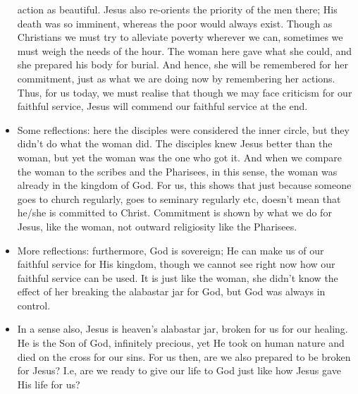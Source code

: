 \begin{itemize}
{  action as beautiful.  Jesus also re-orients the priority of the men there;
  His death was so imminent, whereas the poor would always exist.  Though as
  Christians we must try to alleviate poverty wherever we can, sometimes we
  must weigh the needs of the hour.  The woman here gave what she could, and
  she prepared his body for burial.  And hence, she will be remembered for
  her commitment, just as what we are doing now by remembering her actions.
  Thus, for us today, we must realise that though we may face criticism for
  our faithful service, Jesus will commend our faithful service at the end.
  }
  \item{Some reflections: here the disciples were considered the inner
  circle, but they didn't do what the woman did.  The disciples knew Jesus
  better than the woman, but yet the woman was the one who got it.  And when
  we compare the woman to the scribes and the Pharisees, in this sense, the
  woman was already in the kingdom of God.  For us, this shows that just
  because someone goes to church regularly, goes to seminary regularly etc,
  doesn't mean that he/she is committed to Christ.  Commitment is shown by
  what we do for Jesus, like the woman, not outward religiosity like the
  Pharisees.}
  \item{More reflections: furthermore, God is sovereign; He can make us of
  our faithful service for His kingdom, though we cannot see right now how
  our faithful service can be used.  It is just like the woman, she didn't
  know the effect of her breaking the alabastar jar for God, but God was
  always in control.}
  \item{In a sense also, Jesus is heaven's alabastar jar, broken for us for
  our healing.  He is the Son of God, infinitely precious, yet He took on
  human nature and died on the cross for our sins.  For us then, are we also
  prepared to be broken for Jesus?  I.e, are we ready to give our life to God
  just like how Jesus gave His life for us? }
\end{itemize}